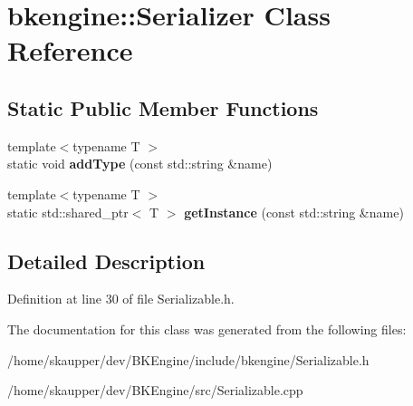 \hypertarget{classbkengine_1_1Serializer}{}\section{bkengine\+:\+:Serializer Class Reference}
\label{classbkengine_1_1Serializer}
\subsection*{Static Public Member Functions}
\begin{DoxyCompactItemize}
\item 
\mbox{\label{classbkengine_1_1Serializer_a80fab1c59d2ddbb9328f6428fb404a66}} 
{\footnotesize template$<$typename T $>$ }\\static void {\bfseries add\+Type} (const std\+::string \&name)
\item 
\mbox{\label{classbkengine_1_1Serializer_ac41e89308a3a250d3fcc2c6ded2fd468}} 
{\footnotesize template$<$typename T $>$ }\\static std\+::shared\+\_\+ptr$<$ T $>$ {\bfseries get\+Instance} (const std\+::string \&name)
\end{DoxyCompactItemize}


\subsection{Detailed Description}


Definition at line 30 of file Serializable.\+h.



The documentation for this class was generated from the following files\+:\begin{DoxyCompactItemize}
\item 
/home/skaupper/dev/\+B\+K\+Engine/include/bkengine/Serializable.\+h\item 
/home/skaupper/dev/\+B\+K\+Engine/src/Serializable.\+cpp\end{DoxyCompactItemize}
